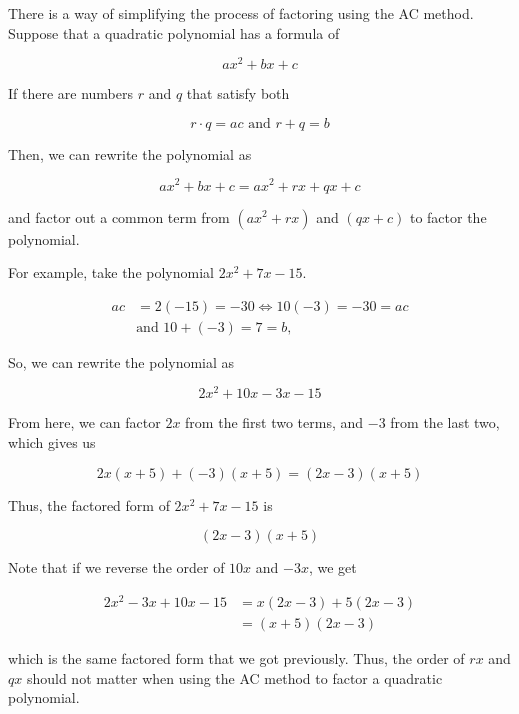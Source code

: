 There is a way of simplifying the process of factoring using the AC method. Suppose that a
quadratic polynomial has a formula of



$$ax^2+bx+c$$



If there are numbers $r$ and $q$ that satisfy both



$$r\cdot q=ac \text{ and } r+q=b$$



Then, we can rewrite the polynomial as



$$ax^2+bx+c=ax^2 + rx + qx + c$$



and factor out a common term from $(ax^2 + rx)$ and $(qx + c)$ to factor the polynomial.



For example, take the polynomial $2x^2 + 7x - 15$.



\begin{align}
ac &= 2(-15) = -30 \Leftrightarrow 10(-3) = -30 = ac \\
   &\text{and } 10 + (-3) = 7 = b,
\end{align}

So, we can rewrite the polynomial as 

$$2x^2 + 10x - 3x - 15$$ 

From here, we can factor $2x$ from the first two terms, and $-3$ from the last two, which gives us 

$$2x(x + 5) + (-3)(x + 5) = (2x - 3)(x + 5)$$ 

Thus, the factored form of $2x^2 + 7x - 15$ is 

$$(2x - 3)(x + 5)$$ 

Note that if we reverse the order of $10x$ and $-3x$, we get 

\begin{align}
2x^2 - 3x + 10x - 15 
&= x(2x - 3) + 5(2x - 3) \\
&= (x + 5)(2x - 3) \
\end{align}

which is the same factored form that we got previously. Thus, the order of $rx$ and $qx$
should not matter when using the AC method to factor a quadratic polynomial.




